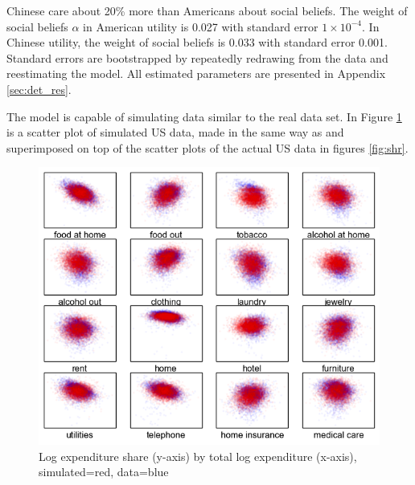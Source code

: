 Chinese care about 20\% more than Americans about social beliefs.  The weight of social beliefs $\alpha$ in American utility is 0.027 with standard error $1\times10^{-4}$.  In Chinese utility, the weight of social beliefs is 0.033 with standard error 0.001.  Standard errors are bootstrapped by repeatedly redrawing from the data and reestimating the model.  All estimated parameters are presented in Appendix \ref{sec:det_res}.

The model is capable of simulating data similar to the real data set. In Figure \ref{fig:shares_fake} is a scatter plot of simulated US data, made in the same way as and superimposed on top of the scatter plots of the actual US data in figures \ref{fig:shr}.
\begin{figure}
	\centering
		\includegraphics[scale=1]{pics/shr_plot_sim.png}
	\caption{Log expenditure share (y-axis) by total log expenditure (x-axis), simulated=red, data=blue}
	\label{fig:shares_fake}
\end{figure}

